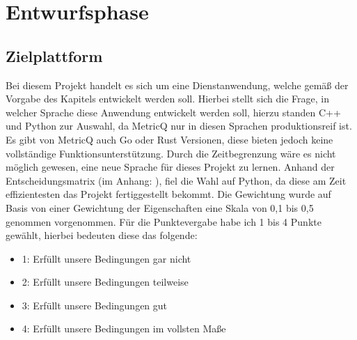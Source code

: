 \section{Entwurfsphase}

\subsection{Zielplattform}
Bei diesem Projekt handelt es sich um eine Dienstanwendung, welche gemäß der Vorgabe des Kapitels  entwickelt werden soll.
Hierbei stellt sich die Frage, in welcher Sprache diese Anwendung entwickelt werden soll, hierzu standen C++ und Python zur Auswahl, da \Gls{MetricQ} nur in diesen Sprachen produktionsreif ist.
Es gibt von \Gls{MetricQ} auch Go oder Rust Versionen, diese bieten jedoch keine vollständige Funktionsunterstützung.
Durch die Zeitbegrenzung wäre es nicht möglich gewesen, eine neue Sprache für dieses Projekt zu lernen.
Anhand der Entscheidungsmatrix (im Anhang: ), fiel die Wahl auf Python, da diese am Zeit effizientesten das Projekt fertiggestellt bekommt.
Die Gewichtung wurde auf Basis von einer Gewichtung der Eigenschaften eine Skala von 0,1 bis 0,5 genommen vorgenommen.
Für die Punktevergabe habe ich 1 bis 4 Punkte gewählt, hierbei bedeuten diese das folgende:

\begin{itemize}
  \item 1: Erfüllt unsere Bedingungen gar nicht
  \item 2: Erfüllt unsere Bedingungen teilweise
  \item 3: Erfüllt unsere Bedingungen gut
  \item 4: Erfüllt unsere Bedingungen im vollsten Maße
\end{itemize}

